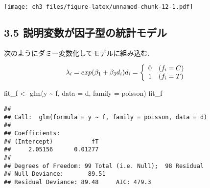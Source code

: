 \documentclass[
]{article}
\newenvironment{Shaded}{\begin{snugshade}}{\end{snugshade}}
\newcommand{\AttributeTok}[1]{\textcolor[rgb]{0.77,0.63,0.00}{#1}}
\newcommand{\DecValTok}[1]{\textcolor[rgb]{0.00,0.00,0.81}{#1}}
\newcommand{\FloatTok}[1]{\textcolor[rgb]{0.00,0.00,0.81}{#1}}
\newcommand{\FunctionTok}[1]{\textcolor[rgb]{0.00,0.00,0.00}{#1}}
\newcommand{\NormalTok}[1]{#1}
\newcommand{\OtherTok}[1]{\textcolor[rgb]{0.56,0.35,0.01}{#1}}
\newcommand{\SpecialCharTok}[1]{\textcolor[rgb]{0.00,0.00,0.00}{#1}}
\begin{document}
\begin{Shaded}
\end{Shaded}

\texttt{[image: ch3\_files/figure-latex/unnamed-chunk-12-1.pdf]}

\hypertarget{ux8aacux660eux5909ux6570ux304cux56e0ux5b50ux578bux306eux7d71ux8a08ux30e2ux30c7ux30eb}{%
\subsection{3.5
説明変数が因子型の統計モデル}\label{ux8aacux660eux5909ux6570ux304cux56e0ux5b50ux578bux306eux7d71ux8a08ux30e2ux30c7ux30eb}}

次のようにダミー変数化してモデルに組み込む.

\[
 \lambda_i = exp(\beta_1 + \beta_3 d_i) \\
 d_i = \left\{
   \begin{array}{ll}
   0 & (f_i = C) \\
   1 & (f_i = T)
   \end{array}
   \right.
\]

\begin{Shaded}
\begin{Highlighting}[]
\NormalTok{fit\_f }\OtherTok{\textless{}{-}} \FunctionTok{glm}\NormalTok{(y }\SpecialCharTok{\textasciitilde{}}\NormalTok{ f, }\AttributeTok{data =}\NormalTok{ d, }\AttributeTok{family =}\NormalTok{ poisson)}
\NormalTok{fit\_f}
\end{Highlighting}
\end{Shaded}

\begin{verbatim}
## 
## Call:  glm(formula = y ~ f, family = poisson, data = d)
## 
## Coefficients:
## (Intercept)           fT  
##     2.05156      0.01277  
## 
## Degrees of Freedom: 99 Total (i.e. Null);  98 Residual
## Null Deviance:       89.51 
## Residual Deviance: 89.48     AIC: 479.3
\end{verbatim}
\end{document}
